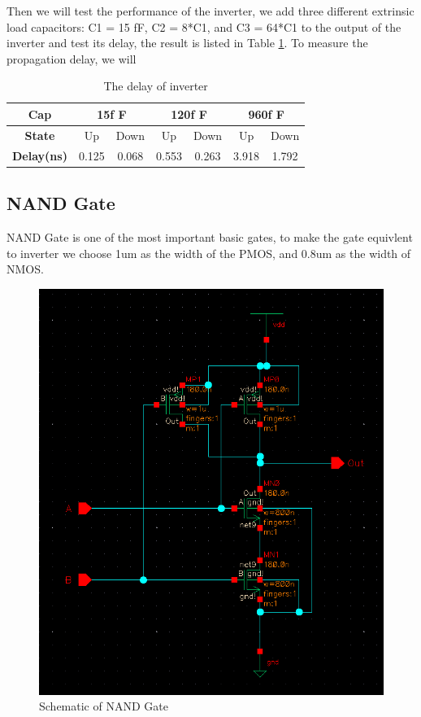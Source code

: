 \documentclass[conference]{IEEEtran}
\begin{document}
Then we will test the performance of the inverter, we add three different extrinsic load capacitors: C1 = 15 fF, C2 = 8*C1, and C3 = 64*C1 to the output of the inverter and test its delay, the result is listed in Table \ref{The delay of inverter}. To measure the propagation delay, we will 

\begin{table}[h]
    \caption{The delay of inverter}
    \begin{center}
        \begin{tabular}{|c|c|c|c|c|c|c|}
            \hline
            \textbf{Cap} & \multicolumn{2}{|c|}{15f F} & \multicolumn{2}{|c|}{120f F} & \multicolumn{2}{|c|}{960f F} \\
            \hline
            \textbf{State} & Up & Down & Up & Down & Up & Down \\
            \hline
           
            \textbf{Delay(ns)} & 0.125 & 0.068 & 0.553 & 0.263 & 3.918 & 1.792 \\
            \hline
        \end{tabular}
    \end{center}
    \label{The delay of inverter}
\end{table}

\subsection{NAND Gate}

NAND Gate is one of the most important basic gates, to make the gate equivlent to inverter we choose 1um as the width of the PMOS, and 0.8um as the width of NMOS.

\begin{figure}[H]
    \centering
    \includegraphics[width = 0.7\linewidth]{nand2_schematic.png}
    \caption{Schematic of NAND Gate}
    \label{Schematic of NAND Gate}
\end{figure}
\end{document}
